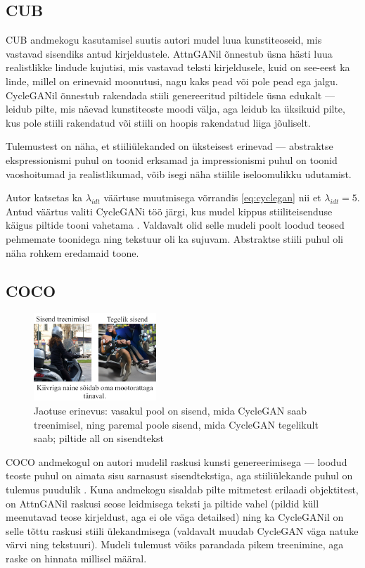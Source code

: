 \documentclass{vilgym}
\begin{document}
	\subsection{CUB}
	CUB andmekogu kasutamisel suutis autori mudel luua kunstiteoseid, mis vastavad sisendiks antud kirjeldustele. AttnGANil õnnestub üsna hästi luua realistlikke lindude kujutisi, mis vastavad teksti kirjeldusele, kuid on see-eest ka linde, millel on erinevaid moonutusi, nagu kaks pead või pole pead ega jalgu. CycleGANil õnnestub rakendada stiili genereeritud piltidele üsna edukalt  --- leidub pilte, mis näevad kunstiteoste moodi välja, aga leidub ka üksikuid pilte, kus pole stiili rakendatud või stiili on hoopis rakendatud liiga jõuliselt.

	Tulemustest on näha, et stiiliülekanded on üksteisest erinevad --- abstraktse ekspressionismi puhul on toonid erksamad ja impressionismi puhul on toonid vaoshoitumad ja realistlikumad, võib isegi näha stiilile iseloomulikku udutamist.

	Autor katsetas ka $ \lambda_{idt} $ väärtuse muutmisega võrrandis \ref{eq:cyclegan} nii et $ \lambda_{idt} = 5 $. Antud väärtus valiti CycleGANi töö järgi, kus mudel kippus stiiliteisenduse käigus piltide tooni vahetama \parencite{cyclegan}. Valdavalt olid selle mudeli poolt loodud teosed pehmemate toonidega ning tekstuur oli ka sujuvam. Abstraktse stiili puhul oli näha rohkem eredamaid toone.

	\subsection{COCO}

	\begin{figure}
		\includegraphics[width=0.41\textwidth]{images/distribution.png}
		\caption{Jaotuse erinevus: vasakul pool on sisend, mida CycleGAN saab treenimisel, ning paremal poole sisend, mida CycleGAN tegelikult saab; piltide all on sisendtekst}
		\label{fig:dist}
	\end{figure}
	COCO andmekogul on autori mudelil raskusi kunsti genereerimisega --- loodud teoste puhul on aimata sisu sarnasust sisendtekstiga, aga stiiliülekande puhul on tulemus puudulik . Kuna andmekogu sisaldab pilte mitmetest erilaadi objektitest, on AttnGANil raskusi seose leidmisega teksti ja piltide vahel (pildid küll meenutavad teose kirjeldust, aga ei ole väga detailsed) ning ka CycleGANil on selle tõttu raskusi stiili ülekandmisega (valdavalt muudab CycleGAN väga natuke värvi ning tekstuuri). Mudeli tulemust võiks parandada pikem treenimine, aga raske on hinnata millisel määral.
\end{document}
